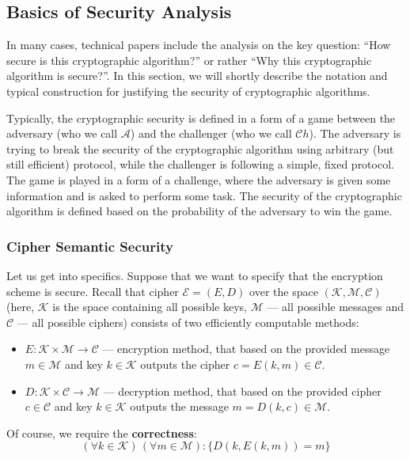 \documentclass[../lecture-notes.tex]{subfiles}
\begin{document}
\subsection{Basics of Security Analysis}

In many cases, technical papers include the analysis on the key question: ``How secure is this cryptographic algorithm?'' or rather ``Why this cryptographic algorithm is secure?''. In this section, we will shortly describe the notation and typical construction for justifying the security of cryptographic algorithms.

Typically, the cryptographic security is defined in a form of a game between the adversary (who we call $\mathcal{A}$) and the challenger (who we call $\mathcal{C}h$). The adversary is trying to break the security of the cryptographic algorithm using arbitrary (but still efficient) protocol, while the challenger is following a simple, fixed protocol. The game is played in a form of a challenge, where the adversary is given some information and is asked to perform some task. The security of the cryptographic algorithm is defined based on the probability of the adversary to win the game.

\subsubsection{Cipher Semantic Security}
Let us get into specifics. Suppose that we want to specify that the encryption scheme is secure. Recall that cipher $\mathcal{E} = (E,D)$ over the space $(\mathcal{K}, \mathcal{M}, \mathcal{C})$ (here, $\mathcal{K}$ is the space containing all possible keys, $\mathcal{M}$ --- all possible messages and $\mathcal{C}$ --- all possible ciphers) consists of two efficiently computable methods:
\begin{itemize}
    \item $E: \mathcal{K} \times \mathcal{M} \to \mathcal{C}$ --- encryption method, that based on the provided message $m \in \mathcal{M}$ and key $k \in \mathcal{K}$ outputs the cipher $c = E(k,m) \in \mathcal{C}$.
    \item $D: \mathcal{K} \times \mathcal{C} \to \mathcal{M}$ --- decryption method, that based on the provided cipher $c \in \mathcal{C}$ and key $k \in \mathcal{K}$ outputs the message $m = D(k,c) \in \mathcal{M}$.
\end{itemize}

Of course, we require the \textbf{correctness}:
\begin{equation*}
    (\forall k \in \mathcal{K}) \, (\forall m \in \mathcal{M}): \{D(k,E(k,m)) = m\}
\end{equation*}
\end{document}
